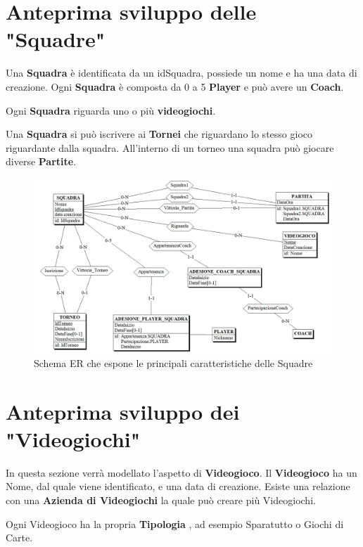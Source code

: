 \documentclass[a4paper,12pt]{report}
\begin{document}
\section{Anteprima sviluppo delle "Squadre"}
Una \textbf{Squadra} è identificata da un idSquadra, possiede un nome e ha una data di creazione.
 Ogni \textbf{Squadra} è composta da 0 a 5 \textbf{Player} e può avere un \textbf{Coach}. 

Ogni \textbf{Squadra} riguarda uno o più \textbf{videogiochi}.  

Una \textbf{Squadra} si può iscrivere ai \textbf{Tornei} che riguardano lo stesso gioco riguardante dalla squadra. All'interno di un torneo una squadra può giocare diverse \textbf{Partite}.

\begin{figure}[!htb]
	\centerline{\includegraphics[scale=0.6]{img/ER_Squadra.png}}
	\caption{Schema ER che espone le principali caratteristiche delle Squadre}
	\label{img:ER_Squadra}
\end{figure}
\section{Anteprima sviluppo dei "Videogiochi"}
In questa sezione verrà modellato l'aspetto di \textbf{Videogioco}. 
Il \textbf{Videogioco} ha un Nome, dal quale viene identificato, e una data di creazione.
 Esiste una relazione con una \textbf{Azienda di Videogiochi} la quale può creare più Videogiochi.
 
 Ogni Videogioco ha la propria \textbf{Tipologia} , ad esempio Sparatutto o Giochi di Carte. 
 
\end{document}

